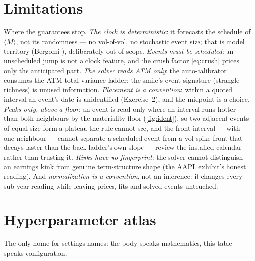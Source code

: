 \documentclass[11pt]{article}
\newcommand{\qv}[1]{\langle #1\rangle}
\begin{document}
\section{Limitations}
\label{sec:limits}

Where the guarantees stop.  \emph{The clock is deterministic}: it
forecasts the schedule of $\qv{M}$, not its randomness --- no
vol-of-vol, no stochastic event size; that is model territory (Bergomi
\cite{Bergomi2016}), deliberately out of scope.  \emph{Events must be
scheduled}: an unscheduled jump is not a clock feature, and the crush
factor \eqref{eq:crush} prices only the anticipated part.  \emph{The
solver reads ATM only}: the auto-calibrator consumes the ATM
total-variance ladder; the smile's event signature (strangle richness)
is unused information.  \emph{Placement is a convention}: within a
quoted interval an event's date is unidentified (Exercise~2), and the
midpoint is a choice.  \emph{Peaks only, above a floor}: an event is
read only where an interval runs hotter than both neighbours by the
materiality floor (\cref{fig:ident}), so two adjacent events of equal
size form a plateau the rule cannot see, and the front interval --- with
one neighbour --- cannot separate a scheduled event from a vol-spike
front that decays faster than the back ladder's own slope --- review the
installed
calendar rather than trusting it.  \emph{Kinks have no fingerprint}:
the solver cannot distinguish an earnings kink from genuine
term-structure shape (the AAPL exhibit's honest reading).  And
\emph{normalization is a convention}, not an inference: it changes
every sub-year reading while leaving prices, fits and solved events
untouched.

\appendix
\section{Hyperparameter atlas}
\label{app:atlas}

The only home for settings names: the body speaks mathematics, this
table speaks configuration.
\end{document}
